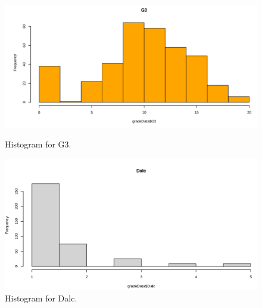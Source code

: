 \documentclass[a4paper]{article}
\begin{document}
\begin{figure}[H]
    \centering
    \begin{minipage}{0.5\textwidth}
        \centering
        \includegraphics[width = 1\linewidth]{Images/11.PNG}
        \caption{Histogram for G3.}
        \label{fig:hist4}
    \end{minipage}%
    \begin{minipage}{0.5\textwidth}
        \centering
        \includegraphics[width = 1\linewidth]{Images/13.PNG}
        \caption{Histogram for Dalc.}
        \label{fig:hist5}
    \end{minipage}
\end{figure}
\end{document}
